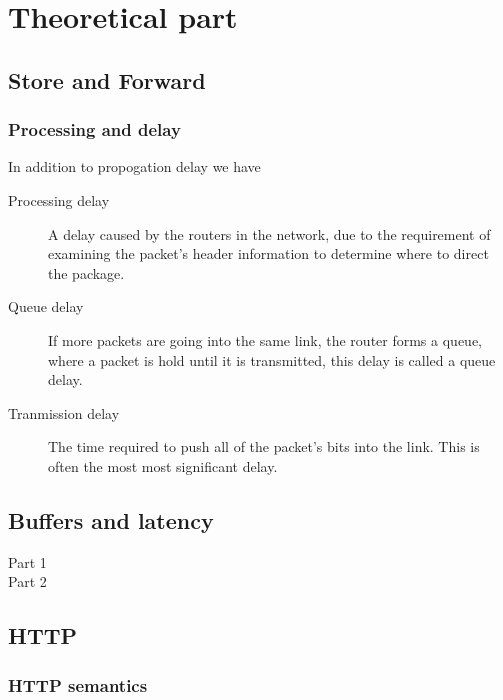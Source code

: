 \documentclass[a4paper]{article}
\begin{document}
\maketitle
\thispagestyle{first}
\newpage

\section{Theoretical part}
\subsection{Store and Forward}
\subsubsection{Processing and delay}
In addition to propogation delay we have

\begin{description}
    \item[Processing delay] A delay caused by the routers in the network,
        due to the requirement of examining the packet's header information to
        determine where to direct the package. 
    \item[Queue delay] If more packets are going into the same link, the
        router forms a queue, where a packet is hold until it is
        transmitted, this delay is called a queue delay.
    \item[Tranmission delay] The time required to push all of the packet's bits
        into the link. This is often the most most significant delay.
\end{description}

\subsection{Buffers and latency}
\begin{description}
    \item[Part 1] 
    \item[Part 2]
\end{description}

\subsection{HTTP}
\subsubsection{HTTP semantics}
\end{document}
